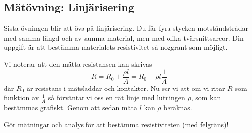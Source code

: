 \documentclass[a4paper,11pt]{article}
\begin{document}
\subsection*{Mätövning: Linjärisering}

Sista övningen blir att öva på linjärisering. Du får fyra stycken 
motståndstrådar med samma längd och av samma
material, men med olika tvärsnittsareor. Din uppgift är att bestämma materialets
resistivitet så noggrant som möjligt. 

Vi noterar att den mätta resistansen kan skrivas
\[
R = R_{0}+\frac{\rho l }{A} = R_{0} + \rho l \frac{1}{A}
\]
där $R_{0}$ är resistans i mätsladdar och kontakter. Nu ser vi att om 
vi ritar $R$  som funktion av $\frac{1}{A}$ så förväntar vi oss en 
rät linje med lutningen $\rho$, som kan bestämmas grafiskt. Genom att sedan mäta
$l$ kan $\rho$ beräknas. 

Gör mätningar och analys för att bestämma resistiviteten (med 
felgräns)!



% 
% 
\end{document}
